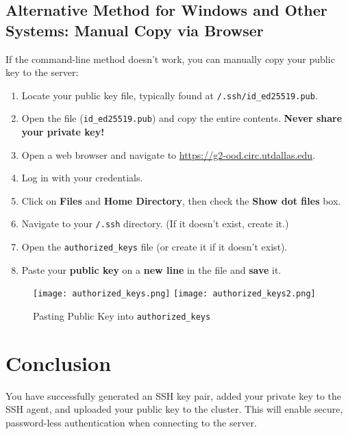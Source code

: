 \documentclass[12pt,letterpaper]{article}
\newcommand{\mytexttilde}{\raisebox{0.5ex}{\texttildelow}}
\begin{document}
    \subsection{Alternative Method for Windows and Other Systems: Manual Copy via Browser}

    If the command-line method doesn't work, you can manually copy your public key to the server:

    \begin{enumerate}
        \item Locate your public key file, typically found at \texttt{\mytexttilde/.ssh/id\_ed25519.pub}.
        \item Open the file (\texttt{id\_ed25519.pub}) and copy the entire contents. \textbf{Never share your private key!}
        \item Open a web browser and navigate to \url{https://g2-ood.circ.utdallas.edu}.
        \item Log in with your credentials.
        \item Click on \textbf{Files} and \textbf{Home Directory}, then check the \textbf{Show dot files} box.
        \item Navigate to your \texttt{\mytexttilde/.ssh} directory. (If it doesn't exist, create it.)
        \item Open the \texttt{authorized\_keys} file (or create it if it doesn't exist).
        \item Paste your \textbf{public key} on a \textbf{new line} in the file and \textbf{save} it.
    \end{enumerate}

    \begin{figure}[H]
        \centering
        \texttt{[image: authorized\_keys.png]}
        \texttt{[image: authorized\_keys2.png]}
        \caption{Pasting Public Key into \texttt{authorized\_keys}}
        \label{fig:authorized_keys}
    \end{figure}

\section{Conclusion}

You have successfully generated an SSH key pair, added your private key to the SSH agent, and uploaded your public key to the cluster. This will enable secure, password-less authentication when connecting to the server.
\end{document}
